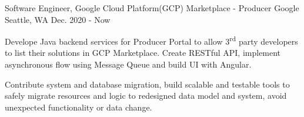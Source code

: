 


\begin{cventries}


	\cventry
	{Software Engineer, Google Cloud Platform(GCP) Marketplace - Producer} %
	{Google} %
	{Seattle, WA} %
	{Dec. 2020 - Now} %
	{
		\begin{cvitems}
			\item{Develope Java backend services for Producer Portal to allow 3\textsuperscript{rd} party developers to list their solutions in GCP Marketplace. Create RESTful API, implement asynchronous flow using Message Queue and build UI with Angular.} %
			\item{Contribute system and database migration, build scalable and testable tools to safely migrate resources and logic to redesigned data model and system, avoid unexpected functionality or data change.} %
		\end{cvitems}
	}



\end{cventries}
